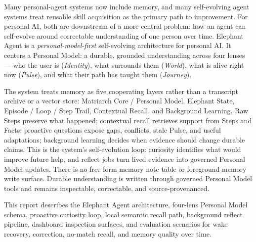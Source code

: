 Many personal-agent systems now include memory, and many self-evolving agent
systems treat reusable skill acquisition as the primary path to improvement.
For personal AI, both are downstream of a more central problem: how an agent can
self-evolve around correctable understanding of one person over time. Elephant
Agent is a \emph{personal-model-first} self-evolving architecture for personal
AI. It centers a Personal Model: a durable, grounded understanding across four
lenses --- who the user is (\textit{Identity}), what surrounds them
(\textit{World}), what is alive right now (\textit{Pulse}), and what their path
has taught them (\textit{Journey}).

The system treats memory as five cooperating layers rather than a transcript
archive or a vector store: Matriarch Core / Personal Model, Elephant State,
Episode / Loop / Step Trail, Contextual Recall, and Background Learning. Raw
Steps preserve what happened; contextual recall retrieves support from Steps
and Facts; proactive questions expose gaps, conflicts, stale Pulse, and useful
adaptations; background learning decides when evidence should change durable
claims. This is the system's self-evolution loop: curiosity identifies what
would improve future help, and reflect jobs turn lived evidence into governed
Personal Model updates. There is no free-form memory-note table or foreground
memory write surface. Durable understanding is written through governed
Personal Model tools and remains inspectable, correctable, and
source-provenanced.

This report describes the Elephant Agent architecture, four-lens Personal Model
schema, proactive curiosity loop, local semantic recall path, background reflect
pipeline, dashboard inspection surfaces, and evaluation scenarios for wake
recovery, correction, no-match recall, and memory quality over time.
